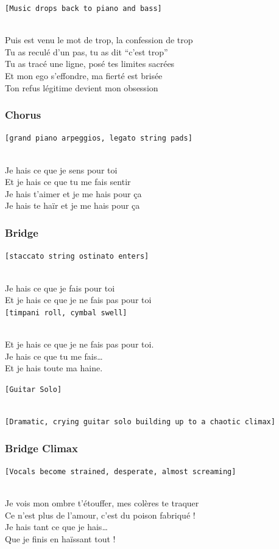 \texttt{{[}Music\ drops\ back\ to\ piano\ and\ bass{]}}\strut \\
Puis est venu le mot de trop, la confession de trop\\
Tu as reculé d'un pas, tu as dit ``c'est trop''\\
Tu as tracé une ligne, posé tes limites sacrées\\
Et mon ego s'effondre, ma fierté est brisée\\
Ton refus légitime devient mon obsession

\subsubsection{Chorus}\label{chorus-25}

\texttt{{[}grand\ piano\ arpeggios,\ legato\ string\ pads{]}}\strut \\
Je hais ce que je sens pour toi\\
Et je hais ce que tu me fais sentir\\
Je hais t'aimer et je me hais pour ça\\
Je hais te haïr et je me hais pour ça

\subsubsection{Bridge}\label{bridge-8}

\texttt{{[}staccato\ string\ ostinato\ enters{]}}\strut \\
Je hais ce que je fais pour toi\\
Et je hais ce que je ne fais pas pour toi\\
\texttt{{[}timpani\ roll,\ cymbal\ swell{]}}\strut \\
Et je hais ce que je ne fais pas pour toi.\\
Je hais ce que tu me fais\ldots{}\\
Et je hais toute ma haine.

\texttt{{[}Guitar\ Solo{]}}\strut \\
\texttt{{[}Dramatic,\ crying\ guitar\ solo\ building\ up\ to\ a\ chaotic\ climax{]}}

\subsubsection{Bridge Climax}\label{bridge-climax}

\texttt{{[}Vocals\ become\ strained,\ desperate,\ almost\ screaming{]}}\strut \\
Je vois mon ombre t'étouffer, mes colères te traquer\\
Ce n'est plus de l'amour, c'est du poison fabriqué !\\
Je hais tant ce que je hais\ldots{}\\
Que je finis en haïssant tout !

